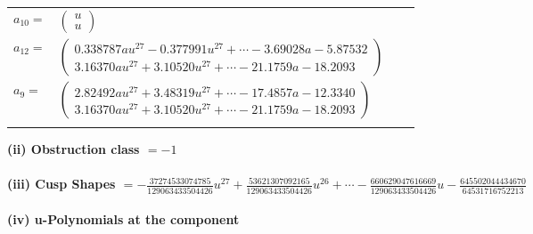 \documentclass[1p]{elsarticle_modified}
\theoremstyle{definition}
\begin{document}
\begin{tabular}{m{7pt} m{180pt} m{7pt} m{180pt} }
\flushright $a_{10}=$&$\begin{pmatrix}u\\u\end{pmatrix}$ \\
\flushright $a_{12}=$&$\begin{pmatrix}0.338787 a u^{27}-0.377991 u^{27}+\cdots-3.69028 a-5.87532\\3.16370 a u^{27}+3.10520 u^{27}+\cdots-21.1759 a-18.2093\end{pmatrix}$ \\
\flushright $a_{9}=$&$\begin{pmatrix}2.82492 a u^{27}+3.48319 u^{27}+\cdots-17.4857 a-12.3340\\3.16370 a u^{27}+3.10520 u^{27}+\cdots-21.1759 a-18.2093\end{pmatrix}$\\&\end{tabular}
\flushleft \textbf{(ii) Obstruction class $= -1$}\\~\\
\flushleft \textbf{(iii) Cusp Shapes $= -\frac{37274533074785}{129063433504426} u^{27}+\frac{53621307092165}{129063433504426} u^{26}+\cdots-\frac{660629047616669}{129063433504426} u-\frac{645502044434670}{64531716752213}$}\\~\\
\newpage\renewcommand{\arraystretch}{1}
\flushleft \textbf{(iv) u-Polynomials at the component}\newline \\
\end{document}
